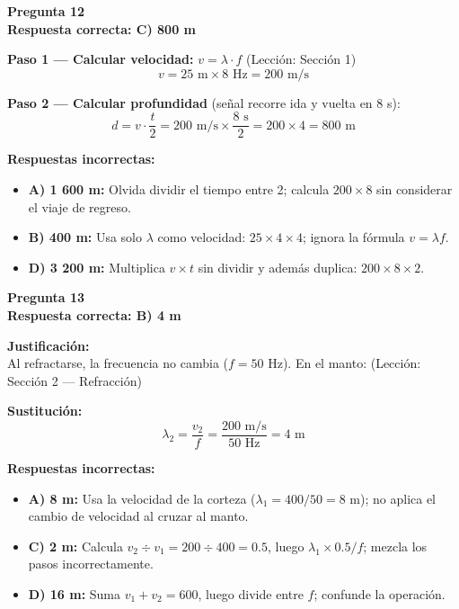 \begin{respuestabox}
\textbf{Pregunta 12}\\
\textcolor{verdecorrecto}{\textbf{Respuesta correcta: C) 800 m}}

\textbf{Paso 1 — Calcular velocidad:} $v = \lambda \cdot f$ (Lección: Sección 1)
$$v = 25 \text{ m} \times 8 \text{ Hz} = 200 \text{ m/s}$$

\textbf{Paso 2 — Calcular profundidad} (señal recorre ida y vuelta en 8 s):
$$d = v \cdot \frac{t}{2} = 200 \text{ m/s} \times \frac{8 \text{ s}}{2} = 200 \times 4 = 800 \text{ m}$$

\textbf{Respuestas incorrectas:}
\begin{itemize}
    \item \textbf{A) 1 600 m:} Olvida dividir el tiempo entre 2; calcula $200 \times 8$ sin considerar el viaje de regreso.
    \item \textbf{B) 400 m:} Usa solo $\lambda$ como velocidad: $25 \times 4 \times 4$; ignora la fórmula $v = \lambda f$.
    \item \textbf{D) 3 200 m:} Multiplica $v \times t$ sin dividir y además duplica: $200 \times 8 \times 2$.
\end{itemize}
\end{respuestabox}

\begin{respuestabox}
\textbf{Pregunta 13}\\
\textcolor{verdecorrecto}{\textbf{Respuesta correcta: B) 4 m}}

\textbf{Justificación:}\\
Al refractarse, la frecuencia no cambia ($f = 50$ Hz). En el manto: (Lección: Sección 2 — Refracción)

\textbf{Sustitución:}
$$\lambda_2 = \frac{v_2}{f} = \frac{200 \text{ m/s}}{50 \text{ Hz}} = 4 \text{ m}$$

\textbf{Respuestas incorrectas:}
\begin{itemize}
    \item \textbf{A) 8 m:} Usa la velocidad de la corteza ($\lambda_1 = 400/50 = 8$ m); no aplica el cambio de velocidad al cruzar al manto.
    \item \textbf{C) 2 m:} Calcula $v_2 \div v_1 = 200 \div 400 = 0.5$, luego $\lambda_1 \times 0.5 / f$; mezcla los pasos incorrectamente.
    \item \textbf{D) 16 m:} Suma $v_1 + v_2 = 600$, luego divide entre $f$; confunde la operación.
\end{itemize}
\end{respuestabox}

